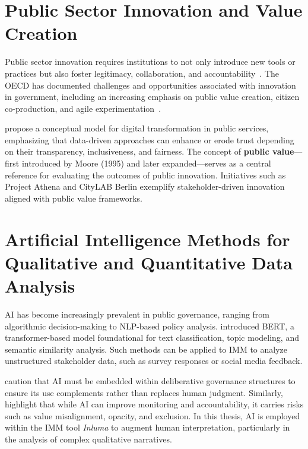 \section{Public Sector Innovation and Value Creation}\label{sec:public-sector-innovation}
Public sector innovation requires institutions to not only introduce new tools or practices but also foster legitimacy, collaboration, and accountability~\parencite{sun2019algorithmic}.
The OECD has documented challenges and opportunities associated with innovation in government, including an increasing emphasis on public value creation, citizen co-production, and agile experimentation~\parencite{oecd2020publicsector}.

\textcite{wirtz2020public} propose a conceptual model for digital transformation in public services, emphasizing that data-driven approaches can enhance or erode trust depending on their transparency, inclusiveness, and fairness.
The concept of \textbf{public value}—first introduced by Moore (1995) and later expanded—serves as a central reference for evaluating the outcomes of public innovation.
Initiatives such as Project Athena and CityLAB Berlin exemplify stakeholder-driven innovation aligned with public value frameworks.

\section{Artificial Intelligence Methods for Qualitative and Quantitative Data Analysis}\label{sec:ai-methods}
AI has become increasingly prevalent in public governance, ranging from algorithmic decision-making to NLP-based policy analysis.
\textcite{devlin2018bert} introduced BERT, a transformer-based model foundational for text classification, topic modeling, and semantic similarity analysis.
Such methods can be applied to IMM to analyze unstructured stakeholder data, such as survey responses or social media feedback.

\textcite{sun2019algorithmic} caution that AI must be embedded within deliberative governance structures to ensure its use complements rather than replaces human judgment.
Similarly, \textcite{brown2020algorithmic} highlight that while AI can improve monitoring and accountability, it carries risks such as value misalignment, opacity, and exclusion.
In this thesis, AI is employed within the IMM tool \textit{Inluma} to augment human interpretation, particularly in the analysis of complex qualitative narratives.

